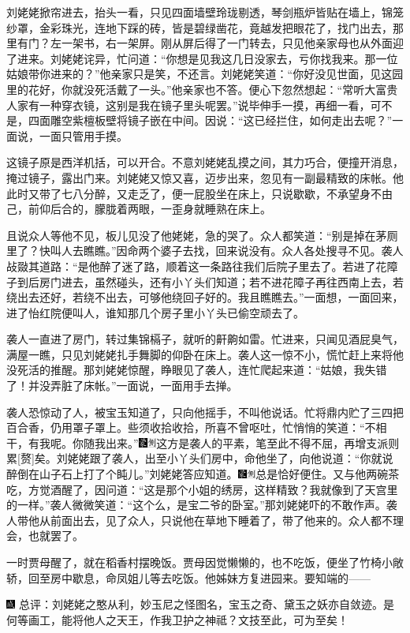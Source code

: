刘姥姥掀帘进去，抬头一看，只见四面墙壁玲珑剔透，琴剑瓶炉皆贴在墙上，锦笼纱罩，金彩珠光，连地下踩的砖，皆是碧绿凿花，竟越发把眼花了，找门出去，那里有门？左一架书，右一架屏。刚从屏后得了一门转去，只见他亲家母也从外面迎了进来。刘姥姥诧异，忙问道：“你想是见我这几日没家去，亏你找我来。那一位姑娘带你进来的？”他亲家只是笑，不还言。刘姥姥笑道：“你好没见世面，见这园里的花好，你就没死活戴了一头。”他亲家也不答。便心下忽然想起：“常听大富贵人家有一种穿衣镜，这别是我在镜子里头呢罢。”说毕伸手一摸，再细一看，可不是，四面雕空紫檀板壁将镜子嵌在中间。因说：“这已经拦住，如何走出去呢？”一面说，一面只管用手摸。

这镜子原是西洋机括，可以开合。不意刘姥姥乱摸之间，其力巧合，便撞开消息，掩过镜子，露出门来。刘姥姥又惊又喜，迈步出来，忽见有一副最精致的床帐。他此时又带了七八分醉，又走乏了，便一屁股坐在床上，只说歇歇，不承望身不由己，前仰后合的，朦胧着两眼，一歪身就睡熟在床上。

且说众人等他不见，板儿见没了他姥姥，急的哭了。众人都笑道：“别是掉在茅厕里了？快叫人去瞧瞧。”因命两个婆子去找，回来说没有。众人各处搜寻不见。袭人敁敠其道路：“是他醉了迷了路，顺着这一条路往我们后院子里去了。若进了花障子到后房门进去，虽然碰头，还有小丫头们知道；若不进花障子再往西南上去，若绕出去还好，若绕不出去，可够他绕回子好的。我且瞧瞧去。”一面想，一面回来，进了怡红院便叫人，谁知那几个房子里小丫头已偷空顽去了。

袭人一直进了房门，转过集锦槅子，就听的鼾齁如雷。忙进来，只闻见酒屁臭气，满屋一瞧，只见刘姥姥扎手舞脚的仰卧在床上。袭人这一惊不小，慌忙赶上来将他没死活的推醒。那刘姥姥惊醒，睁眼见了袭人，连忙爬起来道：“姑娘，我失错了！并没弄脏了床帐。”一面说，一面用手去掸。

袭人恐惊动了人，被宝玉知道了，只向他摇手，不叫他说话。忙将鼎内贮了三四把百合香，仍用罩子罩上。些须收拾收拾，所喜不曾呕吐，忙悄悄的笑道：“不相干，有我呢。你随我出来。”{\includegraphics[width=3mm]{../Images/00006}\includegraphics[width=3mm]{../Images/00011}\footnotesize \kaishu 这方是袭人的平素，笔至此不得不屈，再增支派则累{[}赘{]}矣。}刘姥姥跟了袭人，出至小丫头们房中，命他坐了，向他说道：“你就说醉倒在山子石上打了个盹儿。”刘姥姥答应知道。{\includegraphics[width=3mm]{../Images/00006}\includegraphics[width=3mm]{../Images/00011}\footnotesize \kaishu 总是恰好便住。}又与他两碗茶吃，方觉酒醒了，因问道：“这是那个小姐的绣房，这样精致？我就像到了天宫里的一样。”袭人微微笑道：“这个么，是宝二爷的卧室。”那刘姥姥吓的不敢作声。袭人带他从前面出去，见了众人，只说他在草地下睡着了，带了他来的。众人都不理会，也就罢了。

一时贾母醒了，就在稻香村摆晚饭。贾母因觉懒懒的，也不吃饭，便坐了竹椅小敞轿，回至房中歇息，命凤姐儿等去吃饭。他姊妹方复进园来。要知端的------

{\includegraphics[width=3mm]{../Images/00005} \kaishu 总评：刘姥姥之憨从利，妙玉尼之怪图名，宝玉之奇、黛玉之妖亦自敛迹。是何等画工，能将他人之天王，作我卫护之神祗？文技至此，可为至矣！}

